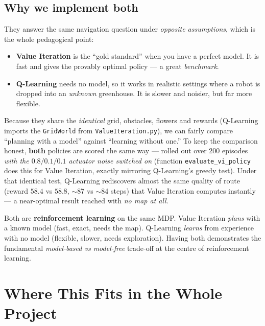 \documentclass[11pt]{article}
\begin{document}
\subsection{Why we implement both}
They answer the same navigation question under \emph{opposite assumptions},
which is the whole pedagogical point:
\begin{itemize}[nosep]
  \item \textbf{Value Iteration} is the ``gold standard'' when you have a perfect
        model. It is fast and gives the provably optimal policy --- a great
        \emph{benchmark}.
  \item \textbf{Q-Learning} needs no model, so it works in realistic settings
        where a robot is dropped into an \emph{unknown} greenhouse. It is slower
        and noisier, but far more flexible.
\end{itemize}
Because they share the \emph{identical} grid, obstacles, flowers and rewards
(Q-Learning imports the \texttt{GridWorld} from \texttt{ValueIteration.py}), we
can fairly compare ``planning with a model'' against ``learning without one.''
To keep the comparison honest, \textbf{both} policies are scored the same way ---
rolled out over 200 episodes \emph{with the $0.8/0.1/0.1$ actuator noise
switched on} (function \texttt{evaluate\_vi\_policy} does this for Value
Iteration, exactly mirroring Q-Learning's greedy test). Under that identical
test, Q-Learning rediscovers almost the same quality of route (reward $58.4$ vs
$58.8$, $\sim$87 vs $\sim$84 steps) that Value Iteration computes instantly ---
a near-optimal result reached with \emph{no map at all}.

\begin{tcolorbox}[colback=green!5!white,colframe=green!45!black,title=Take-away]
Both are \textbf{reinforcement learning} on the same MDP. Value Iteration
\emph{plans} with a known model (fast, exact, needs the map). Q-Learning
\emph{learns} from experience with no model (flexible, slower, needs
exploration). Having both demonstrates the fundamental \emph{model-based vs
model-free} trade-off at the centre of reinforcement learning.
\end{tcolorbox}

\section{Where This Fits in the Whole Project}
\end{document}
